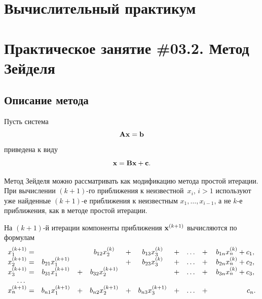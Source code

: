 \documentclass[12pt]{article}
\begin{document}
    \begin{flushright}
	\end{flushright}
	\begin{flushright}
	\end{flushright}
    \section*{Вычислительный практикум}
    \section*{Практическое занятие \#03.2. Метод Зейделя}

	\subsection*{Описание метода}
	
	Пусть система
	\begin{equation}
		\bold{A}\bold{x}=\bold{b}\label{f1}
	\end{equation}
	приведена к виду
	\begin{equation}
		\bold{x}=\bold{Bx}+\bold{c}.\label{f2}
	\end{equation}
	
	Метод Зейделя можно рассматривать как модификацию метода простой итерации. При вычислении $\left(k+1\right)$-го приближения к неизвестной~$x_i$, $i>1$ используют уже найденные $\left(k+1\right)$-е приближения к неизвестным $x_1,\ldots, x_{i-1}$, а не $k$-е приближения, как в методе простой итерации.
	
	На $\left(k+1\right)$-й итерации компоненты приближения $\bold{x}^{\left(k+1\right)}$ вычисляются по формулам
	\begin{equation}
		\begin{matrix}
			x_1^{\left(k+1\right)}  =&                            & &b_{12}x_2^{\left(k\right)}  &+&b_{13}x_3^{\left(k\right)}  &+\hspace{3mm}\ldots\hspace{3mm}+&b_{1n}x_n^{\left(k\right)} + c_1,\\
			x_2^{\left(k+1\right)}  =&b_{21}x_1^{\left(k+1\right)}& &                            &+&b_{23}x_3^{\left(k\right)}  &+\hspace{3mm}\ldots\hspace{3mm}+&b_{2n}x_n^{\left(k\right)} + c_2,\\
			x_3^{\left(k+1\right)}  =&b_{31}x_1^{\left(k+1\right)}&+&b_{32}x_2^{\left(k+1\right)}& &                            &+\hspace{3mm}\ldots\hspace{3mm}+&b_{3n}x_n^{\left(k\right)} + c_3,\\
			\ldots \\
			x_{n}^{\left(k+1\right)}=&b_{n1}x_1^{\left(k+1\right)}&+&b_{n2}x_2^{\left(k+1\right)}&+&b_{n3}x_3^{\left(k+1\right)}&+\hspace{3mm}\ldots\hspace{3mm}+&\hspace{16mm}c_n. \\
		\end{matrix}\label{fm3}
	\end{equation}
	
\end{document}
